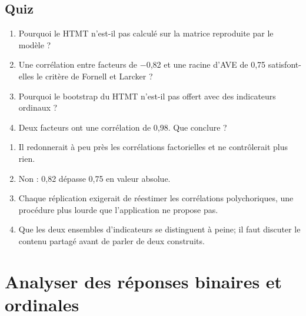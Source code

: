 \documentclass[
  french,
  11pt,
  a4paper,
  DIV=11,
  numbers=noendperiod]{scrreprt}
\providecommand{\tightlist}{%
  \setlength{\itemsep}{0pt}\setlength{\parskip}{0pt}}
\begin{document}
\section{Quiz}\label{quiz-6}

\begin{enumerate}
\def\labelenumi{\arabic{enumi}.}
\tightlist
\item
  Pourquoi le HTMT n'est-il pas calculé sur la matrice reproduite par le
  modèle ?
\item
  Une corrélation entre facteurs de −0,82 et une racine d'AVE de 0,75
  satisfont-elles le critère de Fornell et Larcker ?
\item
  Pourquoi le bootstrap du HTMT n'est-il pas offert avec des indicateurs
  ordinaux ?
\item
  Deux facteurs ont une corrélation de 0,98. Que conclure ?
\end{enumerate}

\begin{tcolorbox}[enhanced jigsaw, arc=.35mm, bottomrule=.15mm, bottomtitle=1mm, breakable, colback=white, colbacktitle=quarto-callout-tip-color!10!white, colframe=quarto-callout-tip-color-frame, coltitle=black, left=2mm, leftrule=.75mm, opacityback=0, opacitybacktitle=0.6, rightrule=.15mm, title={Réponses}, titlerule=0mm, toprule=.15mm, toptitle=1mm]

\begin{enumerate}
\def\labelenumi{\arabic{enumi}.}
\tightlist
\item
  Il redonnerait à peu près les corrélations factorielles et ne
  contrôlerait plus rien.
\item
  Non : 0,82 dépasse 0,75 en valeur absolue.
\item
  Chaque réplication exigerait de réestimer les corrélations
  polychoriques, une procédure plus lourde que l'application ne propose
  pas.
\item
  Que les deux ensembles d'indicateurs se distinguent à peine; il faut
  discuter le contenu partagé avant de parler de deux construits.
\end{enumerate}

\end{tcolorbox}


\chapter{Analyser des réponses binaires et ordinales}\label{sec-ordinal}
\end{document}

